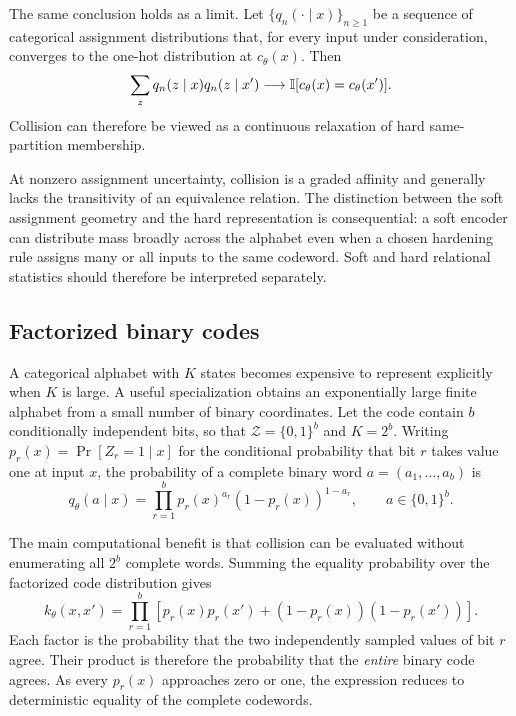 The same conclusion holds as a limit.
Let $\{q_n(\cdot\mid x)\}_{n\ge1}$ be a sequence of categorical assignment distributions that, for every input under consideration, converges to the one-hot distribution at $c_\theta(x)$.
Then
\[
\sum_z q_n(z\mid x)q_n(z\mid x')
\longrightarrow
\mathbb{I}[c_\theta(x)=c_\theta(x')].
\]
Collision can therefore be viewed as a continuous relaxation of hard same-partition membership.

At nonzero assignment uncertainty, collision is a graded affinity and generally lacks the transitivity of an equivalence relation.
The distinction between the soft assignment geometry and the hard representation is consequential: a soft encoder can distribute mass broadly across the alphabet even when a chosen hardening rule assigns many or all inputs to the same codeword.
Soft and hard relational statistics should therefore be interpreted separately.


\subsection{Factorized binary codes}

A categorical alphabet with $K$ states becomes expensive to represent explicitly when $K$ is large.
A useful specialization obtains an exponentially large finite alphabet from a small number of binary coordinates.
Let the code contain $b$ conditionally independent bits, so that
$\mathcal Z=\{0,1\}^b$ and $K=2^b$.
Writing
$p_r(x)=\Pr[Z_r=1\mid x]$ for the conditional probability that bit $r$ takes value one at input $x$, the probability of a complete binary word
$a=(a_1,\ldots,a_b)$ is
\begin{equation}
q_\theta(a\mid x)
=\prod_{r=1}^bp_r(x)^{a_r}(1-p_r(x))^{1-a_r},
\qquad a\in\{0,1\}^b.
\label{eq:factorized-code}
\end{equation}

The main computational benefit is that collision can be evaluated without enumerating all $2^b$ complete words.
Summing the equality probability over the factorized code distribution gives
\begin{equation}
k_\theta(x,x')
=\prod_{r=1}^b\left[p_r(x)p_r(x')+(1-p_r(x))(1-p_r(x'))\right].
\label{eq:bit-collision}
\end{equation}
Each factor is the probability that the two independently sampled values of bit $r$ agree.
Their product is therefore the probability that the \emph{entire} binary code agrees.
As every $p_r(x)$ approaches zero or one, the expression reduces to deterministic equality of the complete codewords.

